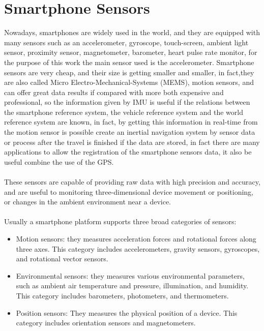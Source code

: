 \documentclass[tesi]{subfiles}
\begin{document}
\section{Smartphone Sensors}\label{sc:Smartphone Sensors}
Nowadays, smartphones are widely used in the world, and they are equipped with many sensors such as an accelerometer, gyroscope, touch-screen, ambient light sensor, proximity sensor, magnetometer, barometer, heart pulse rate monitor, for the purpose of this work the main sensor used is the accelerometer. Smartphone sensors are very cheap, and their size is getting smaller and smaller, in fact,they are also called Micro Electro-Mechanical-Systems (MEMS), motion sensors, and can offer great data results if compared with more both expensive and professional, so the information given by IMU is useful if the relations between the smartphone reference system, the vehicle reference system and the world reference system are known, in fact, by getting this information in real-time from the motion sensor is possible create an inertial navigation system by sensor data or process after the travel is finished if the data are stored, in fact there are many applications to allow the registration of the smartphone sensors data, it also be useful combine the use of the GPS.\\\\

\noindent These sensors are capable of providing raw data with high precision and accuracy, and are useful to monitoring three-dimensional device movement or positioning, or changes in the ambient environment near a device.\\\\
Usually a smartphone platform supports three broad categories of sensors:\cite{Andro}
\begin{itemize}
	\item Motion sensors: they measures acceleration forces and rotational forces along three axes. This category includes accelerometers, gravity sensors, gyroscopes, and rotational vector sensors.
	\item Environmental sensors: they measures various environmental parameters, such as ambient air temperature and pressure, illumination, and humidity. This category includes barometers, photometers, and thermometers.
	\item Position sensors: They measures the physical position of a device. This category includes orientation sensors and magnetometers.
\end{itemize}
\end{document}

